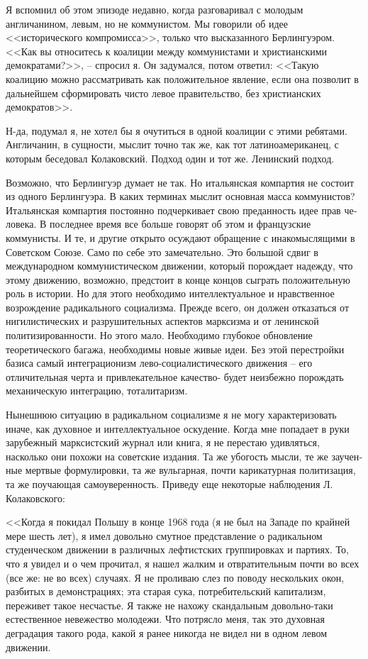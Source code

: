 \documentclass{book}
\begin{document}
Я вспомнил об этом эпизоде недавно, когда разговаривал с молодым англичанином, левым, но не коммунистом. Мы го­ворили об идее <<исторического компромисса>>, только что вы­сказанного Берлингуэром. <<Как вы относитесь к коалиции меж­ду коммунистами и христианскими демократами?>>, -- спросил я. Он задумался, потом ответил: <<Такую коалицию можно рас­сматривать как положительное явление, если она позволит в дальнейшем сформировать чисто левое правительство, без христианских демократов>>.

Н-да, подумал я, не хотел бы я очутиться в одной коалиции с этими ребятами. Англичанин, в сущности, мыслит точно так же, как тот латиноамериканец, с которым беседовал Колаков­ский. Подход один и тот же. Ленинский подход.

Возможно, что Берлингуэр думает не так. Но итальянская компартия не состоит из одного Берлингуэра. В каких терми­нах мыслит основная масса коммунистов? Итальянская ком­партия постоянно подчеркивает свою преданность идее прав че­ловека. В последнее время все больше говорят об этом и фран­цузские коммунисты. И те, и другие открыто осуждают обра­щение с инакомыслящими в Советском Союзе. Само по себе это замечательно. Это большой сдвиг в международном ком­мунистическом движении, который порождает надежду, что этому движению, возможно, предстоит в конце концов сы­грать положительную роль в истории. Но для этого необходимо интеллектуальное и нравственное возрождение радикального социализма. Прежде всего, он должен отказаться от нигилисти­ческих и разрушительных аспектов марксизма и от ленинской политизированности. Но этого мало. Необходимо глубокое обновление теоретического багажа, необходимы новые живые идеи. Без этой перестройки базиса самый интеграционизм лево-социалистического движения -- его отличительная 
черта и при­влекательное качество- будет неизбежно порождать механиче­скую интеграцию, тоталитаризм.

Нынешнюю ситуацию в радикальном социализме я не могу характеризовать иначе, как духовное и интеллектуальное оску­дение. Когда мне попадает в руки зарубежный марксистский журнал или книга, я не перестаю удивляться, насколько они по­хожи на советские издания. Та же убогость мысли, те же заучен­ные мертвые формулировки, та же вульгарная, почти карика­турная политизация, та же поучающая самоуверенность. При­веду еще некоторые наблюдения Л. Колаковского:

<<Когда я покидал Польшу в конце 1968 года (я не был на Западе по крайней мере шесть лет), я имел довольно смутное представление о радикальном студенческом движении в различ­ных лефтистских группировках и партиях. То, что я увидел и о чем прочитал, я нашел жалким и отвратительным почти во всех (все же: не во всех) случаях. Я не проливаю слез по пово­ду нескольких окон, разбитых в демонстрациях; эта старая сука, потребительский капитализм, переживет такое несчастье. Я также не нахожу скандальным довольно-таки естественное невежество молодежи. Что потрясло меня, так это духовная деградация такого рода, какой я ранее никогда не видел ни в одном левом движении.
\end{document}
